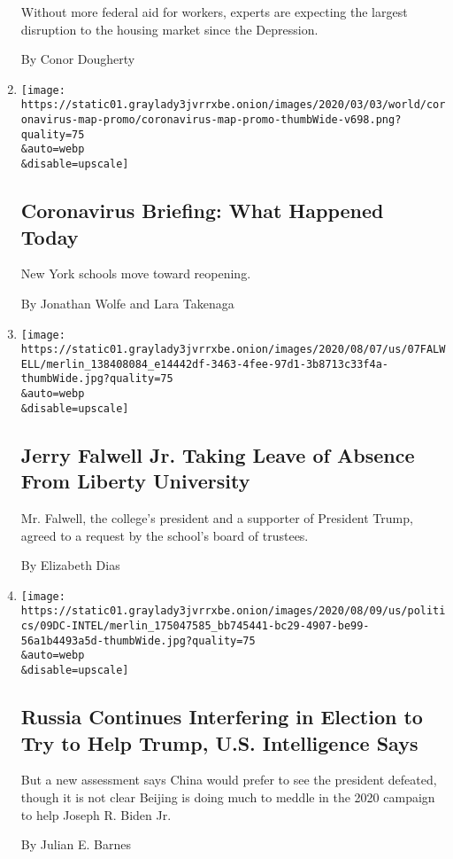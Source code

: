 \begin{enumerate}
  Without more federal aid for workers, experts are expecting the
  largest disruption to the housing market since the Depression.

  By Conor Dougherty
\item
  \href{/2020/08/07/us/coronavirus-today.html}{}

  \texttt{[image: https://static01.graylady3jvrrxbe.onion/images/2020/03/03/world/coronavirus-map-promo/coronavirus-map-promo-thumbWide-v698.png?quality=75\\\&auto=webp\\\&disable=upscale]}

  \hypertarget{coronavirus-briefing-what-happened-today}{%
  \subsection{Coronavirus Briefing: What Happened
  Today}\label{coronavirus-briefing-what-happened-today}}

  New York schools move toward reopening.

  By Jonathan Wolfe and Lara Takenaga
\item
  \href{/2020/08/07/us/falwell-liberty.html}{}

  \texttt{[image: https://static01.graylady3jvrrxbe.onion/images/2020/08/07/us/07FALWELL/merlin\_138408084\_e14442df-3463-4fee-97d1-3b8713c33f4a-thumbWide.jpg?quality=75\\\&auto=webp\\\&disable=upscale]}

  \hypertarget{jerry-falwell-jr-taking-leave-of-absence-from-liberty-university-1}{%
  \subsection{Jerry Falwell Jr. Taking Leave of Absence From Liberty
  University}\label{jerry-falwell-jr-taking-leave-of-absence-from-liberty-university-1}}

  Mr. Falwell, the college's president and a supporter of President
  Trump, agreed to a request by the school's board of trustees.

  By Elizabeth Dias
\item
  \href{/2020/08/07/us/politics/russia-china-trump-biden-election-interference.html}{}

  \texttt{[image: https://static01.graylady3jvrrxbe.onion/images/2020/08/09/us/politics/09DC-INTEL/merlin\_175047585\_bb745441-bc29-4907-be99-56a1b4493a5d-thumbWide.jpg?quality=75\\\&auto=webp\\\&disable=upscale]}

  \hypertarget{russia-continues-interfering-in-election-to-try-to-help-trump-us-intelligence-says}{%
  \subsection{Russia Continues Interfering in Election to Try to Help
  Trump, U.S. Intelligence
  Says}\label{russia-continues-interfering-in-election-to-try-to-help-trump-us-intelligence-says}}

  But a new assessment says China would prefer to see the president
  defeated, though it is not clear Beijing is doing much to meddle in
  the 2020 campaign to help Joseph R. Biden Jr.

  By Julian E. Barnes
\end{enumerate}

